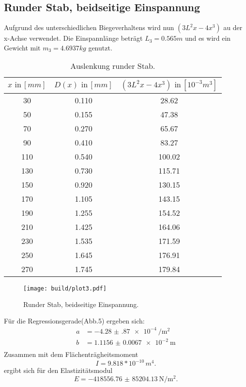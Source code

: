 \subsection{Runder Stab, beidseitige Einspannung}
Aufgrund des unterschiedlichen Biegeverhaltens wird nun $(3L^2x-4x^3)$
au der x-Achse verwendet. Die Einspannlänge beträgt $L_3 = 0.565m$
und es wird ein Gewicht mit $m_3 = 4.6937 kg$ genutzt.

\begin{table}[h]
  \centering
  \label{tab:lit3}
  \begin{tabular}{ c c c }
    \toprule
    $x \,\, \text{in} \, [mm]$
   &{$D(x) \,\, \text{in} \, [mm]$}
   &{$(3L^2x-4x^3)\,\, \text{in} \, [10^{-3}m^3]$} \\

    \midrule
    30  & 0.110 & 28.62\\
    50  & 0.155 & 47.38\\
    70  & 0.270 & 65.67\\
    90  & 0.410 & 83.27\\
    110 & 0.540 & 100.02\\
    130 & 0.730 & 115.71\\
    150 & 0.920 & 130.15\\
    170 & 1.105 & 143.15\\
    190 & 1.255 & 154.52\\
    210 & 1.425 & 164.06\\
    230 & 1.535 & 171.59\\
    250 & 1.645 & 176.91\\
    270 & 1.745 & 179.84\\

    \bottomrule
  \end{tabular}
  \caption{Auslenkung runder Stab.}
\end{table}

\begin{figure}
  \centering
  \texttt{[image: build/plot3.pdf]}
  \caption{Runder Stab, beidseitige Einspannung.}
  \label{fig:plot3}
\end{figure}
Für die Regressionsgerade(Abb.5) ergeben sich:
\begin{align*}
  a &= \SI{-4.28(87)e-4}{\per\square\meter} \\
  b &= \SI{1.1156(67)e-2}{\meter} \\
\end{align*}
Zusammen mit dem Flächenträgheitsmoment
\begin{equation*}
  I = 9.818*10^{-10}\, m^4.
\end{equation*}
ergibt sich für den Elastizitätsmodul
\begin{equation*}
  E = \SI{-418556.76(8520413)}{\newton\per\square\meter} .
\end{equation*}
\newpage
